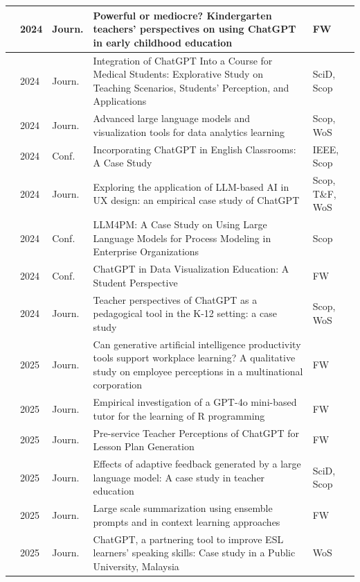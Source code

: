 {\begin{longtable}{|p{}|p{}|p{}|p{}|p{}|}
    \hline
    \cite{Su.2024}&2024&Journ.&Powerful or mediocre? Kindergarten teachers’ perspectives on using ChatGPT in early childhood education&FW\\ 
    \hline
    \cite{Thomae.2024}&2024&Journ.&Integration of ChatGPT Into a Course for Medical Students: Explorative Study on Teaching Scenarios, Students’ Perception, and Applications&SciD, Scop\\ 
    \hline
    \cite{ValverdeRebaza.2024}&2024&Journ.&Advanced large language models and visualization tools for data analytics learning&Scop, WoS\\ 
    \hline
    \cite{Wang.2024}&2024&Conf.&Incorporating ChatGPT in English Classrooms: A Case Study&IEEE, Scop\\ 
    \hline
    \cite{Zhou.2024}&2024&Journ.&Exploring the application of LLM-based AI in UX design: an empirical case study of ChatGPT&Scop, T\&F, WoS\\ 
    \hline
    \cite{Ziche.2024}&2024&Conf.&LLM4PM: A Case Study on Using Large Language Models for Process Modeling in Enterprise Organizations&Scop\\ 
    \hline
    \cite{Kim.922024962024}&2024&Conf.&ChatGPT in Data Visualization Education: A Student Perspective&FW
    \\ \hline
    \cite{Bateman.2025}&2024&Journ.&Teacher perspectives of ChatGPT as a pedagogical tool in the K-12 setting: a case study&Scop, WoS\\ 
    \hline
    \cite{Callari.2025}&2025&Journ.&Can generative artificial intelligence productivity tools support workplace learning? A qualitative study on employee perceptions in a multinational corporation&FW\\ 
    \hline
    \cite{Dielingen.2025}&2025&Journ.&Empirical investigation of a GPT-4o mini-based tutor for the learning of R programming&FW\\ 
    \hline
    \cite{Kalenda.2025}&2025&Journ.&Pre-service Teacher Perceptions of ChatGPT for Lesson Plan Generation&FW\\ 
    \hline
    \cite{Kinder.2025}&2025&Journ.&Effects of adaptive feedback generated by a large language model: A case study in teacher education&SciD, Scop\\ 
    \hline
    \cite{LeivaAraos.2025}&2025&Journ.&Large scale summarization using ensemble prompts and in context learning approaches&FW\\
    \hline
    \cite{Muniandy.2025}&2025&Journ.&ChatGPT, a partnering tool to improve ESL learners' speaking skills: Case study in a Public University, Malaysia&WoS\\ 

\end{longtable}}
